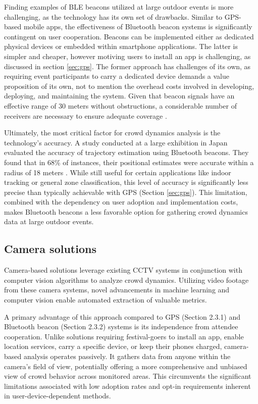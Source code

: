 Finding examples of BLE beacons utilized at large outdoor events is more challenging, as the technology has its own set of drawbacks. Similar to GPS-based mobile apps, the effectiveness of Bluetooth beacon systems is significantly contingent on user cooperation. Beacons can be implemented either as dedicated physical devices or embedded within smartphone applications. The latter is simpler and cheaper, however motiving users to install an app is challenging, as discussed in section \ref{sec:gps}. The former approach has challenges of its own, as requiring event participants to carry a dedicated device demands a value proposition of its own, not to mention the overhead costs involved in developing, deploying, and maintaining the system. Given that beacon signals have an effective range of 30 meters without obstructions, a considerable number of receivers are necessary to ensure adequate coverage \cite{bt_beacon}.

Ultimately, the most critical factor for crowd dynamics analysis is the technology's accuracy. A study conducted at a large exhibition in Japan evaluated the accuracy of trajectory estimation using Bluetooth beacons. They found that  in 68\% of instances, their positional estimates were accurate within a radius of 18 meters \cite{bt_japan}. While still useful for certain applications like indoor tracking or general zone classification, this level of accuracy is significantly less precise than typically achievable with GPS (Section \ref{sec:gps}). This limitation, combined with the dependency on user adoption and implementation costs, makes Bluetooth beacons a less favorable option for gathering crowd dynamics data at large outdoor events.

\subsection{Camera solutions}
Camera-based solutions leverage existing CCTV systems in conjunction with computer vision algorithms to analyze crowd dynamics. Utilizing video footage from these camera systems, novel advancements in machine learning and computer vision enable automated extraction of valuable metrics.

A primary advantage of this approach compared to GPS (Section 2.3.1) and Bluetooth beacon (Section 2.3.2) systems is its independence from attendee cooperation. Unlike solutions requiring festival-goers to install an app, enable location services, carry a specific device, or keep their phones charged, camera-based analysis operates passively. It gathers data from anyone within the camera's field of view, potentially offering a more comprehensive and unbiased view of crowd behavior across monitored areas. This circumvents the significant limitations associated with low adoption rates and opt-in requirements inherent in user-device-dependent methods.

